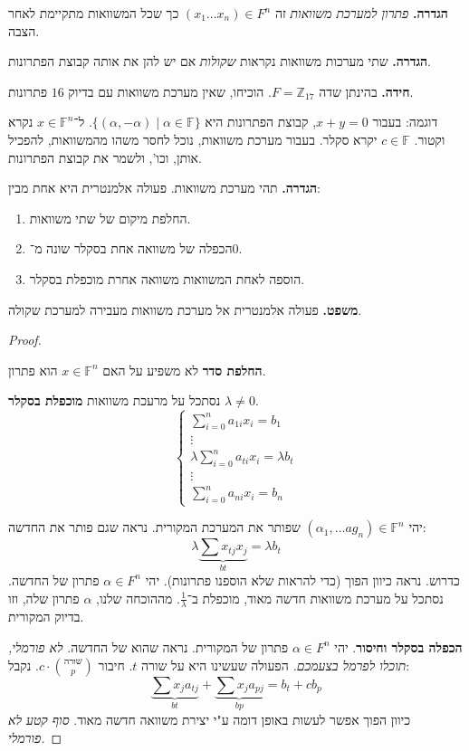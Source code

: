 \documentclass[]{article}
\newcommand\Z     {\mathbb{Z}}
\newcommand\ag    {\alpha}
\newcommand\F     {\mathbb{F}}
\begin{document}
	\textbf{הגדרה. }\textit{פתרון למערכת משוואות} זה $(x_1 \dots x_n) \in F^n$ כך שכל המשוואות מתקיימת לאחר הצבה. 
	
	\textbf{הגדרה. }שתי מערכות משוואות נקראות \textit{שקולות} אם יש להן את אותה קבוצת הפתרונות. 
	
	\textbf{חידה. }בהינתן שדה $F = \Z_{17}$. הוכיחו, שאין מערכת משוואות עם בדיוק $16$ פתרונות. 
	
	דוגמה: בעבור $x + y = 0$, קבוצת הפתרונות היא $\{(\alpha, -\alpha) \mid \alpha \in \mathbb{F}\}$. 
	ל־$x \in \F^n$ נקרא וקטור. $c \in \F$ יקרא סקלר. בעבור מערכת משוואות, נוכל לחסר משהו מהמשוואות, להפכיל אותן, וכו', ולשמר את קבוצת הפתרונות. 
	
	\textbf{הגדרה. }תהי מערכת משוואות. פעולה אלמנטרית היא אחת מבין: 
	\begin{enumerate}
		\item החלפת מיקום של שתי משוואות. 
		\item הכפלה של משוואה אחת בסקלר שונה מ־$0$. 
		\item הוספה לאחת המשוואות משוואה אחרת מוכפלת בסקלר. 
	\end{enumerate}
	\textbf{משפט. }פעולה אלמנטרית אל מערכת משוואות מעבירה למערכת שקולה. 
	\begin{proof} \ 
		
		\textbf{החלפת סדר} לא משפיע על האם $x \in \F^n$ הוא פתרון. 
		
		נסתכל על מרעכת משוואות \textbf{מוכפלת בסקלר} $\lambda \neq 0$. 
		\[ \begin{cases}
			\sum_{i = 0}^{n}a_{1i}x_i = b_1 \\
			\vdots \\
			\lambda \sum_{i = 0}^{n}a_{ti}x_i = \lambda b_t \\
			\vdots \\
			\sum_{i = 0}^{n}a_{ni}x_i = b_n
		\end{cases} \]
		
		יהי $(\ag_1, \dots ag_n) \in \F^n$ שפותר את המערכת המקורית. נראה שגם פותר את החדשה: 
		\[ \lambda \underbrace{\sum x_{tj}x_j}_{bt} = \lambda b_t \]
		כדרוש. 
		נראה כיוון הפוך (כדי להראות שלא הוספנו פתרונות). יהי $\ag \in F^n$ פתרון של החדשה. נסתכל על מערכת משוואות חדשה מאוד, מוכפלת ב־$\frac{1}{\lambda}$. מההוכחה שלנו, $\alpha$ פתרון שלה, וזו בדיוק המקורית. 
		
		\textbf{הכפלה בסקלר וחיסור}. יהי $\ag \in F^n$ פתרון של המקורית. נראה שהוא של החדשה. 
		\textit{לא פורמלי, תוכלו לפרמל בצעמכם. }הפעולה שעשינו היא על שורה $t$. חיבור $c \cdot \binom{\text{שורה}}{p}$. נקבל: 
		\[ \underbrace{\sum x_j a_{tj}}_{bt} + \underbrace{\sum x_j a_{pj}}_{bp} = b_t + cb_p \]
		כיוון הפוך אפשר לעשות באופן דומה ע"י יצירת משוואה חדשה מאוד. 
		\textit{סוף קטע לא פורמלי. }
		
	\end{proof}
	
\end{document}

